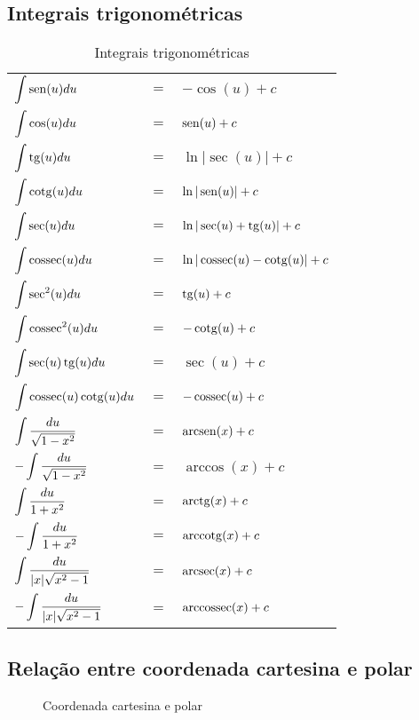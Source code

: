 \subsection{Integrais trigonométricas}
	\begin{table}[H]
		\centering
		\begin{tabular}{|lcl|}
			$\displaystyle\int \operatorname{sen}(u)du$                      & $=$ & $-\cos(u) + c$                   \\
			$\displaystyle\int \cos(u)du$                      & $=$ & $\operatorname{sen}(u) + c$                    \\
			$\displaystyle\int \operatorname{tg}(u)du$                       & $=$ & $\ln|\sec(u)| + c$               \\
			$\displaystyle\int \operatorname{cotg}(u)du$                     & $=$ & $\ln|\operatorname{sen}(u)| + c$               \\
			$\displaystyle\int \sec(u)du$                      & $=$ & $\ln|\sec(u) + \operatorname{tg}(u)| + c$      \\
			$\displaystyle\int \operatorname{cossec}(u)du$                   & $=$ & $\ln|\operatorname{cossec}(u) - \operatorname{cotg}(u)| + c$ \\
			$\displaystyle\int \sec^2(u)du$                    & $=$ & $\operatorname{tg}(u) + c$                     \\
			$\displaystyle\int \operatorname{cossec}^2(u)du$                 & $=$ & $-\operatorname{cotg}(u) + c$                  \\
			$\displaystyle\int \sec(u)\operatorname{tg}(u)du$                & $=$ & $\sec(u) + c$                    \\
			$\displaystyle\int \operatorname{cossec}(u)\operatorname{cotg}(u)du$           & $=$ & $-\operatorname{cossec}(u) + c$                \\
			$\displaystyle\int \dfrac{du}{\sqrt{1 - x^2}}$     & $=$ & $\operatorname{arcsen}(x) + c$                 \\
			$-\displaystyle\int \dfrac{du}{\sqrt{1 - x^2}}$    & $=$ & $\arccos(x) + c$                 \\
			$\displaystyle\int \dfrac{du}{1 + x^2}$            & $=$ & $\operatorname{arctg}(x) + c$                  \\
			$-\displaystyle\int \dfrac{du}{1 + x^2}$           & $=$ & $\operatorname{arccotg}(x) + c$                \\
			$\displaystyle\int \dfrac{du}{|x|\sqrt{x^2 - 1}}$  & $=$ & $\operatorname{arcsec}(x) + c$                 \\
			$-\displaystyle\int \dfrac{du}{|x|\sqrt{x^2 - 1}}$ & $=$ & $\operatorname{arccossec}(x) + c$
		\end{tabular}
		\caption{Integrais trigonométricas}
		\label{integrais_trigonometricas}
	\end{table}

\subsection{Relação entre coordenada cartesina e polar}
	\begin{figure}[H]
		\centering
		\quad\quad
		
		\caption{Coordenada cartesina e polar}
		\label{coordenada_cartesiana_polar}
	\end{figure}
	
